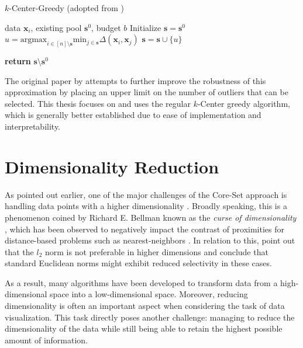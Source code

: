 \documentclass[english,bachelor,ul]{webisthesis} %
\begin{document}
\begin{algorithm}[htpb]
    \caption{$k$-Center-Greedy (adopted from \cite{DBLP:conf/iclr/SenerS18})}%
\label{alg:coreset}

\begin{algorithmic}

\Require data $ \mathbf{x}_i $, existing pool $ \mathbf{s}^0 $, budget $ b $
\State Initialize $ \mathbf{s} = \mathbf{s}^0 $
\Repeat
\State $ u = \text{argmax}_{i \in [n] \setminus \mathbf{s}} \text{min}_{j \in \mathbf{s}} \Delta(\mathbf{x}_i, \mathbf{x}_j) $
\State $ \mathbf{s} = \mathbf{s} \cup \{u\} $

\State \textbf{return} $\mathbf{s} \setminus \mathbf{s}^0 $
\end{algorithmic}
\end{algorithm}

The original paper by \cite{DBLP:conf/iclr/SenerS18} attempts to further improve the robustness of this approximation by placing an upper limit on the number of outliers that can be selected. This thesis focuses on and uses the regular $k$-Center greedy algorithm, which is generally better established due to ease of implementation and interpretability.

\section{Dimensionality Reduction}

As pointed out earlier, one of the major challenges of the Core-Set approach is handling data points with a higher dimensionality \citep{DBLP:conf/iccv/SinhaED19}. Broadly speaking, this is a phenomenon coined by Richard E. Bellman known as the \textit{curse of dimensionality} \citep{Freimer1961AdaptiveCP}, which has been observed to negatively impact the contrast of proximities for distance-based problems such as nearest-neighbors \citep{DBLP:conf/icdt/BeyerGRS99, DBLP:books/lib/HastieTF09}. In relation to this, \cite{DBLP:conf/icdt/AggarwalHK01} point out that the $ l_2 $ norm is not preferable in higher dimensions and \cite{DBLP:conf/iwann/VerleysenF05} conclude that standard Euclidean norms might exhibit reduced selectivity in these cases.

As a result, many algorithms have been developed to transform data from a high-dimensional space into a low-dimensional space. Moreover, reducing dimensionality is often an important aspect when considering the task of data visualization. This task directly poses another challenge: managing to reduce the dimensionality of the data while still being able to retain the highest possible amount of information. 
\end{document}
